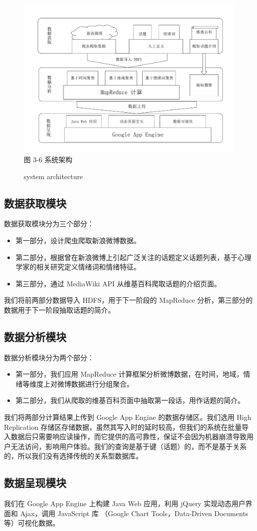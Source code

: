 \begin{figure}[t]
\centering
\includegraphics[width=\textwidth]{arch_min}
图 3-6 系统架构
\caption{system architecture}
\end{figure}


\subsection{数据获取模块}
数据获取模块分为三个部分：
\begin{itemize}
\item 第一部分，设计爬虫爬取新浪微博数据。
\item 第二部分，根据曾在新浪微博上引起广泛关注的话题定义话题列表，基于心理学家的相关研究定义情绪词和情绪特征。
\item 第三部分，通过 MediaWiki API 从维基百科爬取话题的介绍页面。
\end{itemize}
我们将前两部分数据导入 HDFS，用于下一阶段的 MapReduce 分析，第三部分的数据用于下一阶段抽取话题的简介。

\subsection{数据分析模块}
数据分析模块分为两个部分：
\begin{itemize}
\item 第一部分，我们应用 MapReduce 计算框架分析微博数据，在时间，地域，情绪等维度上对微博数据进行分组聚合。
\item 第二部分，我们从爬取的维基百科页面中抽取第一段话，用作话题的简介。
\end{itemize}
我们将两部分计算结果上传到 Google App Engine 的数据存储区。我们选用 High Replication 存储区存储数据，虽然其写入时的延时较高，但我们的系统在批量导入数据后只需要响应读操作，而它提供的高可靠性，保证不会因为机器崩溃导致用户无法访问，影响用户体验。我们的查询是基于键（话题）的，而不是基于关系的，所以我们没有选择传统的关系型数据库\cite{database}。

\subsection{数据呈现模块}
我们在 Google App Engine 上构建 Java Web 应用，利用 jQuery 实现动态用户界面和 Ajax，调用 JavaScript 库 （Google Chart Tools\cite{gct}，Data-Driven Documents\cite{d3}等）可视化数据。





